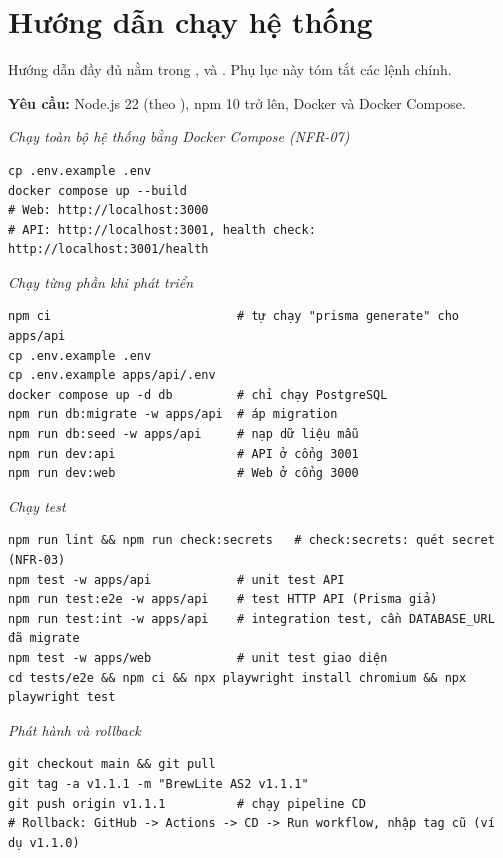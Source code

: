 \section{Hướng dẫn chạy hệ thống}\label{app:huongdan}
Hướng dẫn đầy đủ nằm trong ,  và . Phụ lục này tóm tắt các lệnh chính.

\textbf{Yêu cầu:} Node.js 22 (theo ), npm 10 trở lên, Docker và Docker Compose.

\noindent\textit{Chạy toàn bộ hệ thống bằng Docker Compose (NFR-07)}
\begin{Verbatim}
cp .env.example .env
docker compose up --build
# Web: http://localhost:3000
# API: http://localhost:3001, health check: http://localhost:3001/health
\end{Verbatim}

\noindent\textit{Chạy từng phần khi phát triển}
\begin{Verbatim}
npm ci                          # tự chạy "prisma generate" cho apps/api
cp .env.example .env
cp .env.example apps/api/.env
docker compose up -d db         # chỉ chạy PostgreSQL
npm run db:migrate -w apps/api  # áp migration
npm run db:seed -w apps/api     # nạp dữ liệu mẫu
npm run dev:api                 # API ở cổng 3001
npm run dev:web                 # Web ở cổng 3000
\end{Verbatim}

\noindent\textit{Chạy test}
\begin{Verbatim}
npm run lint && npm run check:secrets   # check:secrets: quét secret (NFR-03)
npm test -w apps/api            # unit test API
npm run test:e2e -w apps/api    # test HTTP API (Prisma giả)
npm run test:int -w apps/api    # integration test, cần DATABASE_URL đã migrate
npm test -w apps/web            # unit test giao diện
cd tests/e2e && npm ci && npx playwright install chromium && npx playwright test
\end{Verbatim}

\noindent\textit{Phát hành và rollback}
\begin{Verbatim}
git checkout main && git pull
git tag -a v1.1.1 -m "BrewLite AS2 v1.1.1"
git push origin v1.1.1          # chạy pipeline CD
# Rollback: GitHub -> Actions -> CD -> Run workflow, nhập tag cũ (ví dụ v1.1.0)
\end{Verbatim}

